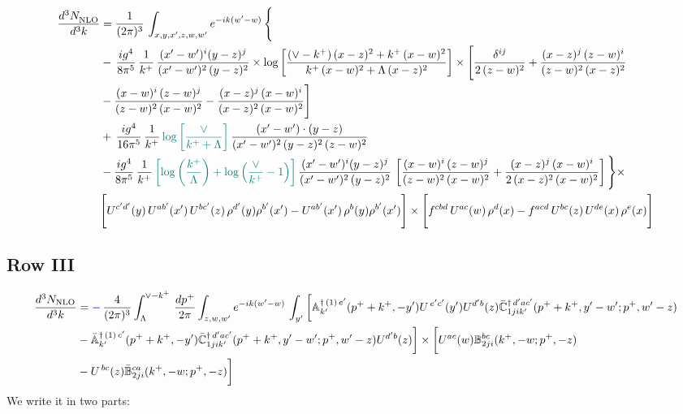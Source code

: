 \documentclass[9pt]{article}
\def\mf#1{\mathbb{#1}}
\numberwithin{equation}{section}
\begin{document}
\begin{align}
     \frac{d^{3}N_{\rm NLO}^{\rm}}{d^{3}k}  & =  \frac{1}{(2\pi)^{3}}\, \int_{x,y,x',z,w,w^{\prime}} e^{-ik(w^{\prime}-w)}\, \Bigg\{\notag \\ & -\,\frac{ig^{4}}{8\pi^{5}}\,\frac{1}{k^{+}}\,\frac{(x'-w')^{i}(y-z)^{j}}{(x'-w')^{2}\,(y-z)^{2}}\times \log{\left[\frac{(\vee-k^{+})\,(x-z)^{2}+k^{+}\,(x-w)^{2}}{k^{+}\,(x-w)^{2}+\Lambda\, (x-z)^{2}}\right]}\times \Bigg[\frac{\delta^{ij}}{2\,(z-w)^{2}}+\frac{(x-z)^{j}\,(z-w)^{i}}{(z-w)^{2}\,(x-z)^{2}}\notag \\ & -\frac{(x-w)^{i}\,(z-w)^{j}}{(z-w)^{2}\,(x-w)^{2}}-\frac{(x-z)^{j}\,(x-w)^{i}}{(x-z)^{2}\,(x-w)^{2}}\Bigg]\notag \\ & +\,\frac{ig^{4}}{16\pi^{5}}\,\frac{1}{k^{+}}\,{\color{teal}\log{\left[\frac{\vee}{k^{+}+\Lambda}\right]}}\, \frac{(x'-w')\cdot (y-z)}{(x'-w')^{2}\,(y-z)^{2}\,(z-w)^{2}}\notag \\ & -\frac{ig^{4}}{8\pi^{5}}\,\frac{1}{k^{+}}\,{\color{teal}\left[\log{\left(\frac{k^{+}}{\Lambda}\right)}+\log{\left(\frac{\vee}{k^{+}}-1\right)}\right]}\,\frac{(x'-w')^{i}(y-z)^{j}}{(x'-w')^{2}\,(y-z)^{2}}\,\left[\frac{(x-w)^{i}\,(z-w)^{j}}{(z-w)^{2}\,(x-w)^{2}}+\frac{(x-z)^{j}\,(x-w)^{i}}{2\,(x-z)^{2}\, (x-w)^{2}}\right]\Bigg\}\times \notag \\ & \Bigg[U^{c'd'}(y)\,U^{ab'}(x')\,U^{bc'}(z)\,\rho^{d'}(y)\rho^{b'}(x')-U^{ab'}(x')\,\rho^{b}(y)\rho^{b'}(x')\Bigg]\times\Bigg[f^{cbd}\,U^{ac}(w)\,\rho^{d}(x)-f^{acd}\, U^{bc}(z)\,U^{de}(x)\,\rho^{e}(x)\Bigg]
\end{align}
 \subsection{Row III\,}
 \begin{align}
    \frac{d^{3}N_{\rm NLO}}{d^{3}k} & = {\color{blue}-}\,\frac{4}{(2\pi)^{3}} \int_{\Lambda}^{\vee -k^{+}}\, \frac{dp^{+}}{2\pi}\int_{z,w,w^{\prime}} e^{-ik(w^{\prime}-w)}\,\int_{y^{\prime}}\bigg[\mf{A}^{\dagger\, (1)\,e^{\prime}}_{k^{\prime}}(p^{+}+k^{+},-y^{\prime})U^{\, e^{\prime}c^{\prime}}(y^{\prime})U^{d^{\prime}b}(z) \Bar{\mf{C}}^{\dagger\, d^{\prime}ac^{\prime}}_{1jik^{\prime}}(p^{+}+k^{+},y^{\prime}-w^{\prime}; p^{+},w^{\prime}-z)\notag \\ &  -\Bar{\mf{A}}^{\dagger\, (1)\,c^{\prime}}_{k^{\prime}}(p^{+}+k^{+},-y^{\prime}) \Bar{\mf{C}}^{\dagger\, d^{\prime}ac^{\prime}}_{1jik^{\prime}}(p^{+}+k^{+},y^{\prime}-w^{\prime}; p^{+},w^{\prime}-z)U^{d^{\prime}b}(z)\bigg] \times \bigg[U^{ac}(w) \mf{B}^{bc}_{2ji}(k^{+},-w;p^{+},-z)\notag \\ &  -U^{\, bc}(z)\Bar{\mf{B}}^{ca}_{2ji}(k^{+},-w; p^{+},-z)\bigg]\nonumber
\end{align}
We write it in two parts:
\end{document}
